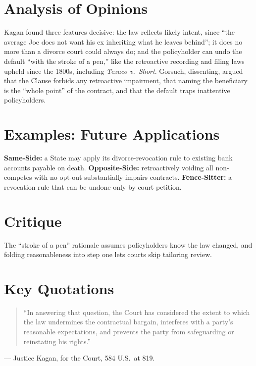 \documentclass[12pt]{article}
\begin{document}
\section{Analysis of Opinions}
Kagan found three features decisive: the law reflects likely intent, since ``the average Joe does not want his ex inheriting what he leaves behind''; it does no more than a divorce court could always do; and the policyholder can undo the default ``with the stroke of a pen,'' like the retroactive recording and filing laws upheld since the 1800s, including \textit{Texaco v.\ Short}. Gorsuch, dissenting, argued that the Clause forbids any retroactive impairment, that naming the beneficiary is the ``whole point'' of the contract, and that the default traps inattentive policyholders.

\section{Examples: Future Applications}
\textbf{Same-Side:} a State may apply its divorce-revocation rule to existing bank accounts payable on death. \textbf{Opposite-Side:} retroactively voiding all non-competes with no opt-out substantially impairs contracts. \textbf{Fence-Sitter:} a revocation rule that can be undone only by court petition.

\section{Critique}
The ``stroke of a pen'' rationale assumes policyholders know the law changed, and folding reasonableness into step one lets courts skip tailoring review.

\section{Key Quotations}
\begin{quote}
``In answering that question, the Court has considered the extent to which the law undermines the contractual bargain, interferes with a party's reasonable expectations, and prevents the party from safeguarding or reinstating his rights.''
\end{quote}
\noindent --- Justice Kagan, for the Court, 584 U.S.\ at 819.
\end{document}

